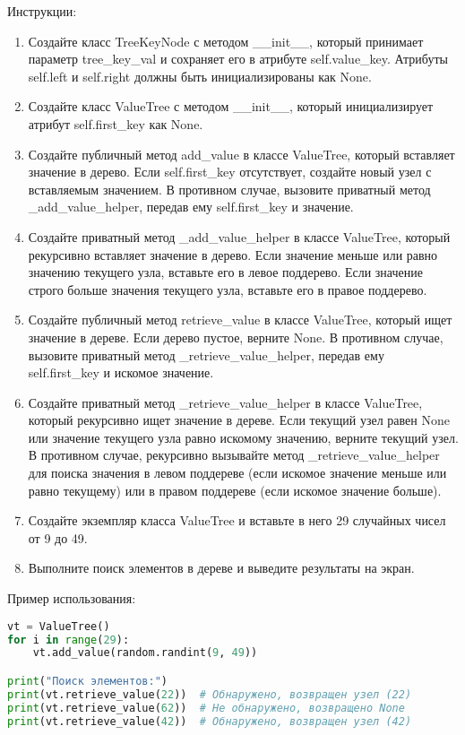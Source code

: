 \begin{enumerate}
Инструкции:
\begin{enumerate}
    \item Создайте класс TreeKeyNode с методом \_\_init\_\_, который принимает параметр tree\_key\_val и сохраняет его в атрибуте self.value\_key. Атрибуты self.left и self.right должны быть инициализированы как None.
    \item Создайте класс ValueTree с методом \_\_init\_\_, который инициализирует атрибут self.first\_key как None.
    \item Создайте публичный метод add\_value в классе ValueTree, который вставляет значение в дерево. Если self.first\_key отсутствует, создайте новый узел с вставляемым значением. В противном случае, вызовите приватный метод \_add\_value\_helper, передав ему self.first\_key и значение.
    \item Создайте приватный метод \_add\_value\_helper в классе ValueTree, который рекурсивно вставляет значение в дерево. Если значение меньше или равно значению текущего узла, вставьте его в левое поддерево. Если значение строго больше значения текущего узла, вставьте его в правое поддерево.
    \item Создайте публичный метод retrieve\_value в классе ValueTree, который ищет значение в дереве. Если дерево пустое, верните None. В противном случае, вызовите приватный метод \_retrieve\_value\_helper, передав ему self.first\_key и искомое значение.
    \item Создайте приватный метод \_retrieve\_value\_helper в классе ValueTree, который рекурсивно ищет значение в дереве. Если текущий узел равен None или значение текущего узла равно искомому значению, верните текущий узел. В противном случае, рекурсивно вызывайте метод \_retrieve\_value\_helper для поиска значения в левом поддереве (если искомое значение меньше или равно текущему) или в правом поддереве (если искомое значение больше).
    \item Создайте экземпляр класса ValueTree и вставьте в него 29 случайных чисел от 9 до 49.
    \item Выполните поиск элементов в дереве и выведите результаты на экран.
\end{enumerate}

Пример использования:
\begin{lstlisting}[language=Python]
vt = ValueTree()
for i in range(29):
    vt.add_value(random.randint(9, 49))

print("Поиск элементов:")
print(vt.retrieve_value(22))  # Обнаружено, возвращен узел (22)
print(vt.retrieve_value(62))  # Не обнаружено, возвращено None
print(vt.retrieve_value(42))  # Обнаружено, возвращен узел (42)
\end{lstlisting}


\end{enumerate}
